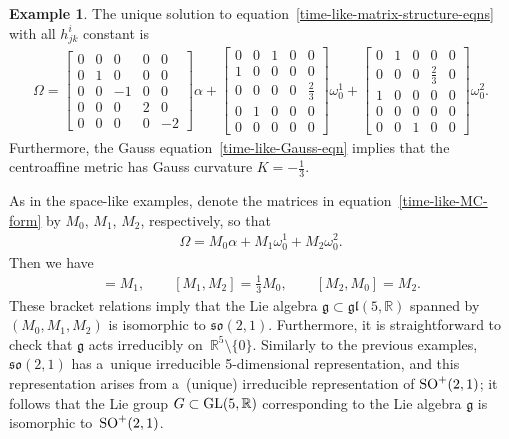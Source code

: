 \documentclass[10pt,a4paper]{amsart}
\numberwithin{equation}{section}
\theoremstyle{definition}
\newtheorem{exmpl}[teo]{Example}
\begin{document}
\begin{exmpl}
\label{time-like-example}
The unique solution to equation~\eqref{time-like-matrix-structure-eqns} with all $h^i_{jk}$ constant is
\begin{gather}
\Omega =
\begin{bmatrix}
0 & 0 & 0 & 0 & 0
\\
0 & 1 & 0 & 0 & 0
\\
0 & 0 & -1 & 0 & 0
\\
0 & 0 & 0 & 2 & 0
\\
0 & 0 & 0 & 0 & -2
\end{bmatrix}
\alpha +
\begin{bmatrix}
0 & 0 & 1 & 0 & 0
\\
1 & 0 & 0 & 0 & 0
\\
0 & 0 & 0 & 0 & \tfrac{2}{3}
\\
0 & 1 & 0 & 0 & 0
\\
0 & 0 & 0 & 0 & 0
\end{bmatrix}
\omega^1_0 +
\begin{bmatrix}
0 & 1 & 0 & 0 & 0
\\
0 & 0 & 0 & \tfrac{2}{3} & 0
\\
1 & 0 & 0 & 0 & 0
\\
0 & 0 & 0 & 0 & 0
\\
0 & 0 & 1 & 0 & 0
\end{bmatrix}
\omega^2_0.
\label{time-like-MC-form}
\end{gather}
Furthermore, the Gauss equation~\eqref{time-like-Gauss-eqn} implies that the centroaf\/f\/ine metric has Gauss curvature $K =
-\tfrac{1}{3}$.

As in the space-like examples, denote the matrices in equation~\eqref{time-like-MC-form} by $M_0$, $M_1$, $M_2$, respectively,
so that
\begin{gather*}
\Omega = M_0 \alpha + M_1  \omega^1_0 + M_2  \omega^2_0.
\end{gather*}
Then we have
\begin{gather*}
[M_0, M_1] = M_1,
\qquad
[M_1, M_2] = \tfrac{1}{3} M_0,
\qquad
[M_2, M_0] = M_2.
\end{gather*}
These bracket relations imply that the Lie algebra $\mathfrak{g} \subset \mathfrak{gl}(5,\mathbb{R})$ spanned by $(M_0,
M_1, M_2)$ is isomorphic to $\mathfrak{so}(2,1)$.
Furthermore, it is straightforward to check that $\mathfrak{g}$ acts irreducibly on~$\mathbb{R}^5 \setminus \{0 \}$.
Similarly to the previous examples, $\mathfrak{so}(2,1)$ has a~unique irreducible 5-dimensional representation, and this
representation arises from a~(unique) irreducible representation of ${\rm SO}^+(2,1)$; it follows that the Lie group $G
\subset {\rm GL}(5,\mathbb{R})$ corresponding to the Lie algebra $\mathfrak{g}$ is isomorphic to~${\rm SO}^+(2,1)$.


\end{exmpl}
\end{document}
